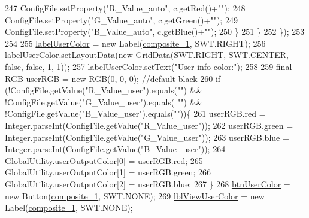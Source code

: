 \begin{DoxyCode}
247                       ConfigFile.setProperty(\textcolor{stringliteral}{"R\_Value\_auto"}, c.getRed()+\textcolor{stringliteral}{""});
248                       ConfigFile.setProperty(\textcolor{stringliteral}{"G\_Value\_auto"}, c.getGreen()+\textcolor{stringliteral}{""});
249                       ConfigFile.setProperty(\textcolor{stringliteral}{"B\_Value\_auto"}, c.getBlue()+\textcolor{stringliteral}{""});
250                   \}
251                 \}
252             \});
253         
254         
255         \hyperlink{classit_1_1isislab_1_1masonhelperdocumentation_1_1mason_1_1wizards_1_1_b___project_information_page_a7b37d666f12fa1c7ea739a7a9878ba9b}{labelUserColor} = \textcolor{keyword}{new} Label(\hyperlink{classit_1_1isislab_1_1masonhelperdocumentation_1_1mason_1_1wizards_1_1_b___project_information_page_ad2438c6d59f23f0717a1503f4e823bb8}{composite\_1}, SWT.RIGHT);
256         labelUserColor.setLayoutData(\textcolor{keyword}{new} GridData(SWT.RIGHT, SWT.CENTER, \textcolor{keyword}{false}, \textcolor{keyword}{false}, 1, 1));
257         labelUserColor.setText(\textcolor{stringliteral}{"User info color:"});
258         
259         \textcolor{keyword}{final} RGB userRGB = \textcolor{keyword}{new} RGB(0, 0, 0);   \textcolor{comment}{//default black}
260         \textcolor{keywordflow}{if} (!ConfigFile.getValue(\textcolor{stringliteral}{"R\_Value\_user"}).equals(\textcolor{stringliteral}{""}) && !ConfigFile.getValue(\textcolor{stringliteral}{"G\_Value\_user"}).equals(\textcolor{stringliteral}{
      ""}) && !ConfigFile.getValue(\textcolor{stringliteral}{"B\_Value\_user"}).equals(\textcolor{stringliteral}{""}))\{
261             userRGB.red = Integer.parseInt(ConfigFile.getValue(\textcolor{stringliteral}{"R\_Value\_user"}));
262             userRGB.green = Integer.parseInt(ConfigFile.getValue(\textcolor{stringliteral}{"G\_Value\_user"}));
263             userRGB.blue = Integer.parseInt(ConfigFile.getValue(\textcolor{stringliteral}{"B\_Value\_user"}));
264             GlobalUtility.userOutputColor[0] = userRGB.red;
265             GlobalUtility.userOutputColor[1] = userRGB.green;
266             GlobalUtility.userOutputColor[2] = userRGB.blue;
267         \}
268         \hyperlink{classit_1_1isislab_1_1masonhelperdocumentation_1_1mason_1_1wizards_1_1_b___project_information_page_a50713187368f9e3d91689c820090feb2}{btnUserColor} = \textcolor{keyword}{new} Button(\hyperlink{classit_1_1isislab_1_1masonhelperdocumentation_1_1mason_1_1wizards_1_1_b___project_information_page_ad2438c6d59f23f0717a1503f4e823bb8}{composite\_1}, SWT.NONE);
269         \hyperlink{classit_1_1isislab_1_1masonhelperdocumentation_1_1mason_1_1wizards_1_1_b___project_information_page_ab1b4ec7a5a8736cf063250290326f061}{lblViewUserColor} = \textcolor{keyword}{new} Label(\hyperlink{classit_1_1isislab_1_1masonhelperdocumentation_1_1mason_1_1wizards_1_1_b___project_information_page_ad2438c6d59f23f0717a1503f4e823bb8}{composite\_1}, SWT.NONE);

\end{DoxyCode}
